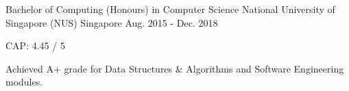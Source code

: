

\begin{cventries}

  \cventry
    {Bachelor of Computing (Honours) in Computer Science} %
    {National University of Singapore (NUS)} %
    {Singapore} %
    {Aug. 2015 - Dec. 2018} %
    {
      \begin{cvitems} %
        \item {CAP: 4.45 / 5}
        \item {Achieved A+ grade for Data Structures \& Algorithms and Software Engineering modules.}
      \end{cvitems}
    }

\end{cventries}
